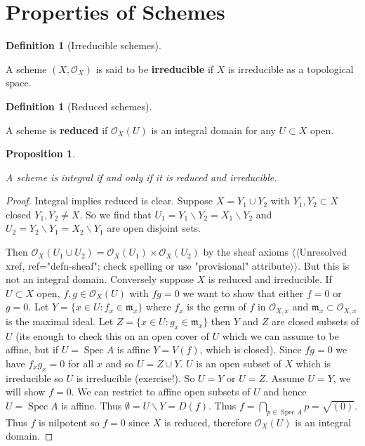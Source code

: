 \documentclass[10pt,]{book}
\newcommand{\terminology}[1]{\textbf{#1}}
\theoremstyle{plain}
\newtheorem{proposition}[theorem]{Proposition}
\theoremstyle{definition}
\newtheorem{definition}[theorem]{Definition}
\numberwithin{equation}{section}
\newcommand{\sO}{\mathcal{O}}
\newcommand{\fm}{\mathfrak{m}}
\DeclareMathOperator{\Spec}{Spec}
\begin{document}
\section[Properties of Schemes]{Properties of Schemes}\label{sec-props-schemes}
\begin{definition}[Irreducible schemes]\label{definition-7}

            A scheme \((X, \sO_X)\) is said to be \terminology{irreducible} if \(X\) is irreducible as a topological space.
          \end{definition}
\begin{definition}[Reduced schemes]\label{definition-8}

            A scheme is \terminology{reduced} if \(\sO_X(U)\) is an integral domain for any \(U \subset X\) open.
          \end{definition}
\begin{proposition}\label{proposition-3}

            A scheme is integral if and only if it is reduced and irreducible.
          \end{proposition}
\begin{proof}

            Integral implies reduced is clear. \newline{}
            Suppose \(X  = Y_1 \cup Y_2\) with \(Y_1,Y_2 \subset X\) closed \(Y_1,Y_2 \ne X\).
            So we find that \(U_1 = Y_1 \smallsetminus Y_2 = X_1 \smallsetminus Y_2\) and \(U_2 = Y_2 \smallsetminus Y_1 = X_2 \smallsetminus Y_1\) are open disjoint sets.

            Then \(\sO_X(U_1\cup U_2) = \sO_X(U_1) \times \sO_X(U_2)\) by the sheaf axioms {$\langle\langle$Unresolved xref, ref="defn-sheaf"; check spelling or use "provisional" attribute$\rangle\rangle$}.
            But this is not an integral domain.
            Conversely suppose \(X\) is reduced and irreducible.
            If \(U \subset X\) open, \(f,g\in \sO_X(U)\) with \(fg = 0\) we want to show that either \(f=0\) or \(g= 0\).
            Let \(Y  =\{x\in U : f_x \in \fm_x\}\) where \(f_x\) is the germ of \(f\) in \(\sO_{X,x}\) and \(\fm_x\subset \sO_{X,x}\) is the maximal ideal.
            Let \(Z = \{x\in  U: g_x \in \fm_x\}\) then \(Y\) and \(Z\) are closed subsets of \(U\) (its enough to check this on an open cover of \(U\) which we can assume to be affine, but if \(U = \Spec A\) is affine \(Y = V(f)\), which is closed).
            Since \(fg = 0\) we have \(f_x g_x = 0\) for all \(x\) and so \(U = Z\cup Y\).
            \(U\) is an open subset of \(X\) which is irreducible so \(U\) is irreducible (exercise!).
            So \(U = Y\) or \(U = Z\).
            Assume \(U = Y\), we will show \(f = 0\).
            We can restrict to affine open subsets of \(U\) and hence \(U =\Spec A\) is affine. Thus \(\emptyset = U \smallsetminus Y = D(f)\).
            Thus \(f = \bigcap_{p\in\Spec A} p = \sqrt{(0)}\).
            Thus \(f\) is nilpotent so \(f = 0\) since \(X\) is reduced, therefore \(\sO_X(U)\) is an integral domain.
          \end{proof}
\end{document}
